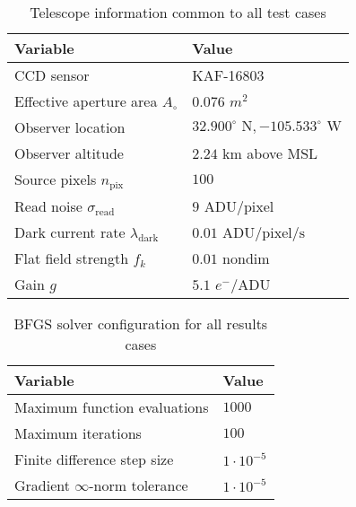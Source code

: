 \documentclass[a4paper,twocolumn]{spaceDebrisC} %
\begin{document}
\begin{table}[H]
  \centering
  \caption{Telescope information common to all test cases}
  \vspace*{6pt}
  \begin{tabular}{|l|l|}
  \hline
  \textbf{Variable} & \textbf{Value} \\ \hline
  CCD sensor & KAF-16803 \\ \hline
  Effective aperture area $A_\circ$ & $0.076$ $m^2$ \\ \hline
  Observer location & $32.900^\circ \textrm{ N}, -105.533^\circ \textrm{ W}$ \\ \hline
  Observer altitude & $2.24$ km above MSL \\ \hline
  Source pixels $n_\text{pix}$ & $100$ \\ \hline
  Read noise $\sigma_\text{read}$ & $9$ $\text{ADU} / \text{pixel}$ \\ \hline
  Dark current rate $\lambda_\text{dark}$ & $0.01$ $\text{ADU} / \text{pixel} / \text{s}$ \\ \hline
  Flat field strength $f_k$ & $0.01$ nondim \\ \hline
  Gain $g$ & $5.1$ $e^- / \text{ADU}$ \\ \hline
  \end{tabular}
  \label{tb:tele_info}
 \end{table}

 \begin{table}[H]
  \centering
  \caption{BFGS solver configuration for all results cases}
  \vspace*{6pt}
  \begin{tabular}{|l|l|}
  \hline
  \textbf{Variable} & \textbf{Value} \\ \hline
  Maximum function evaluations & $1000$ \\ \hline
  Maximum iterations & $100$ \\ \hline
  Finite difference step size & $1 \cdot 10^{-5}$ \\ \hline
  Gradient $\infty$-norm tolerance & $1 \cdot 10^{-5}$ \\ \hline
  \end{tabular}
  \label{tb:bfgs_info}
 \end{table}


\end{document}

